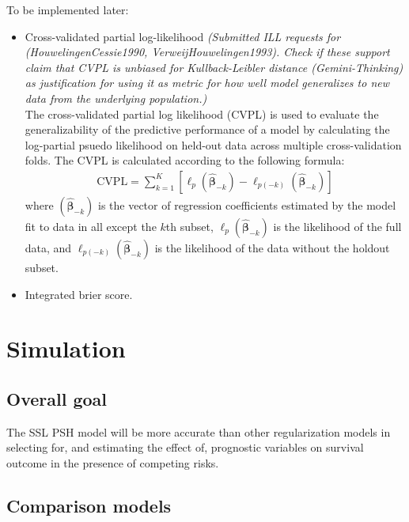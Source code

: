 \documentclass[11pt,a4paper]{article}
\let\cite\parencite
\begin{document}
To be implemented later:
\begin{itemize}
    \item Cross-validated partial log-likelihood \cite{Simon2011, Houwelingen2006} \textit{(Submitted ILL requests for (HouwelingenCessie1990, VerweijHouwelingen1993). Check if these support claim that CVPL is unbiased for Kullback-Leibler distance (Gemini-Thinking) as justification for using it as metric for how well model generalizes to new data from the underlying population.)} \\

    The cross-validated partial log likelihood (CVPL) is used to evaluate the generalizability of the predictive performance of a model by calculating the log-partial psuedo likelihood on held-out data across multiple cross-validation folds. The CVPL is calculated according to the following formula:
    \begin{align*}
        \mathrm{CVPL} = \sum^{K}_{k=1}\left[\ell_p(\hat{\boldsymbol{\beta}}_{-k}) - \ell_{p(-k)}(\hat{\boldsymbol{\beta}}_{-k})  \right]
    \end{align*}
    where $(\hat{\boldsymbol{\beta}}_{-k})$ is the vector of regression coefficients estimated by the model fit to data in all except the $k$th subset, $\ell_p(\hat{\boldsymbol{\beta}}_{-k})$ is the likelihood of the full data, and $\ell_{p(-k)}(\hat{\boldsymbol{\beta}}_{-k})$ is the likelihood of the data without the holdout subset. 

    \item Integrated brier score. 

    

    
\end{itemize}



\newpage
\section{Simulation}

\subsection{Overall goal}
The SSL PSH model will be more accurate than other regularization models in selecting for, and estimating the effect of, prognostic variables on survival outcome in the presence of competing risks.

\subsection{Comparison models}
\end{document}
